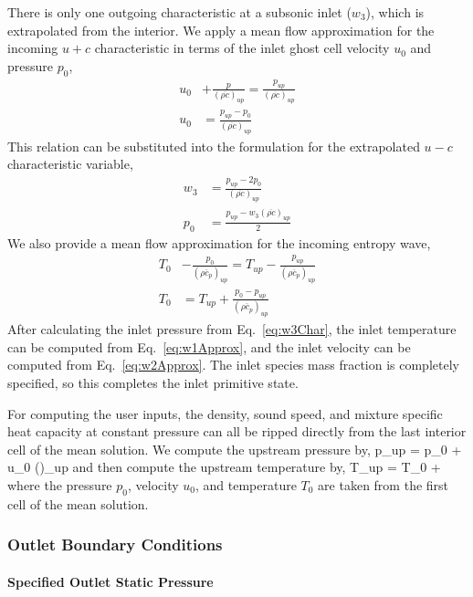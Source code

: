 There is only one outgoing characteristic at a subsonic inlet ($w_3$), which is extrapolated from the interior. We apply a mean flow approximation for the incoming $u+c$ characteristic in terms of the inlet ghost cell velocity $u_0$ and pressure $p_0$,
\begin{align}\label{eq:w2Approx}
	u_0 &+ \frac{p}{(\overline{\rho c})_{up}} = \frac{p_{up}}{(\overline{\rho c})_{up}} \\
	u_0 &= \frac{p_{up} - p_0}{(\overline{\rho c})_{up}}
\end{align}
This relation can be substituted into the formulation for the extrapolated $u-c$ characteristic variable,
\begin{align}\label{eq:w3Char}
	w_3 &= \frac{p_{up} - 2 p_0}{(\overline{\rho c})_{up}} \\
	p_0 &= \frac{p_{up} - w_3 (\overline{\rho c})_{up}}{2} 
\end{align}
We also provide a mean flow approximation for the incoming entropy wave,
\begin{align}\label{eq:w1Approx}
	T_0 &- \frac{p_0}{(\overline{\rho c_p})_{up}} = T_{up} - \frac{p_{up}}{(\overline{\rho c_p})_{up}} \\
	T_0 &= T_{up} + \frac{p_0 - p_{up}}{(\overline{\rho c_p})_{up}}
\end{align}
After calculating the inlet pressure from Eq.~\ref{eq:w3Char}, the inlet temperature can be computed from Eq.~\ref{eq:w1Approx}, and the inlet velocity can be computed from Eq.~\ref{eq:w2Approx}. The inlet species mass fraction is completely specified, so this completes the inlet primitive state.

For computing the user inputs, the density, sound speed, and mixture specific heat capacity at constant pressure can all be ripped directly from the last interior cell of the mean solution. We compute the upstream pressure by,
\be
	p_{up} = p_0 + u_0 ()_{up}
\ee
and then compute the upstream temperature by,
\be
	T_{up} = T_0 + 
\ee
where the pressure $p_0$, velocity $u_0$, and temperature $T_0$ are taken from the first cell of the mean solution.

\subsubsection{Outlet Boundary Conditions}

\paragraph{Specified Outlet Static Pressure}

